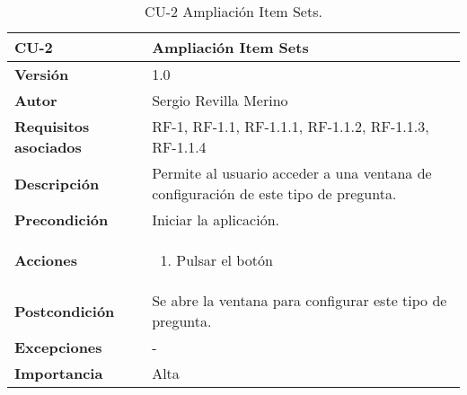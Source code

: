 \begin{table}[h]
	\centering
	\begin{tabularx}{\linewidth}{ p{} p{} }
		\toprule
		\textbf{CU-2}    & \textbf{Ampliación Item Sets}\\
		\toprule
		\textbf{Versión}              & 1.0    \\
		\textbf{Autor}                & Sergio Revilla Merino \\
		\textbf{Requisitos asociados} & RF-1, RF-1.1, RF-1.1.1, RF-1.1.2, RF-1.1.3, RF-1.1.4 \\
		\textbf{Descripción}          & Permite al usuario acceder a una ventana de configuración de este tipo de pregunta. \\
		\textbf{Precondición}         & Iniciar la aplicación. \\
		\textbf{Acciones}             &
		\begin{enumerate}
			\def\labelenumi{\arabic{enumi}.}
			\tightlist
            \item Pulsar el botón
		\end{enumerate} \\
		\textbf{Postcondición}        & Se abre la ventana para configurar este tipo de pregunta. \\
		\textbf{Excepciones}          & - \\
		\textbf{Importancia}          & Alta \\
		\bottomrule
	\end{tabularx}
	\caption{CU-2 Ampliación Item Sets.}
\end{table}

